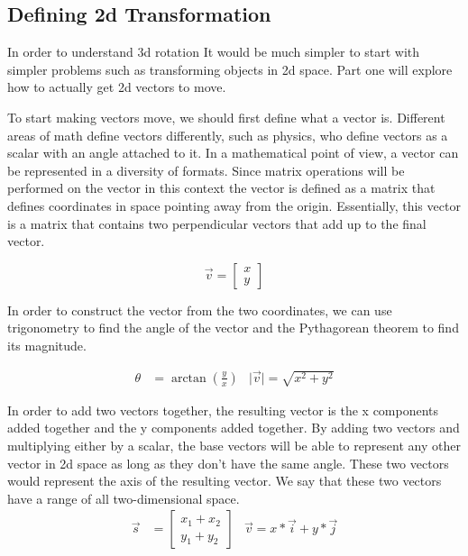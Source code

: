 \subsection{Defining 2d Transformation}
\hspace{\parindent}%
In order to understand 3d rotation It would be much simpler to start with simpler problems such as transforming objects in 2d space. Part one will explore how to actually get 2d vectors to move.

To start making vectors move, we should first define what a vector is. Different areas of math define vectors differently, such as physics, who define vectors as a scalar with an angle attached to it. In a mathematical point of view, a vector can be represented in a diversity of formats. Since matrix operations will be performed on the vector in this context the vector is defined as a matrix that defines coordinates in space pointing away from the origin. Essentially, this vector is a matrix that contains two perpendicular vectors that add up to the final vector.

\begin{equation} \vec{v} = \begin{bmatrix} x \\ y \end{bmatrix} \end{equation}


In order to construct the vector from the two coordinates, we can use trigonometry to find the angle of the vector and the Pythagorean theorem to find its magnitude.

\begin{align} \theta &= \arctan\left(\frac{y}{x}\right) & \lvert \vec{v} \rvert = \sqrt{x^2 + y^2} \end{align}

In order to add two vectors together, the resulting vector is the x components added together and the y components added together. By adding two vectors and multiplying either by a scalar, the base vectors will be able to represent any other vector in 2d space as long as they don’t have the same angle. These two vectors would represent the axis of the resulting vector. We say that these two vectors have a range of all two-dimensional space.
\begin{align}\label{eq2}
	\vec{s}&=\left[\begin{array}{llllllllll}x_1+x_2 \\y_1+y_2\end{array}\right] &
	\vec{v}=x*\vec{i}+y*\vec{j}
\end{align}

